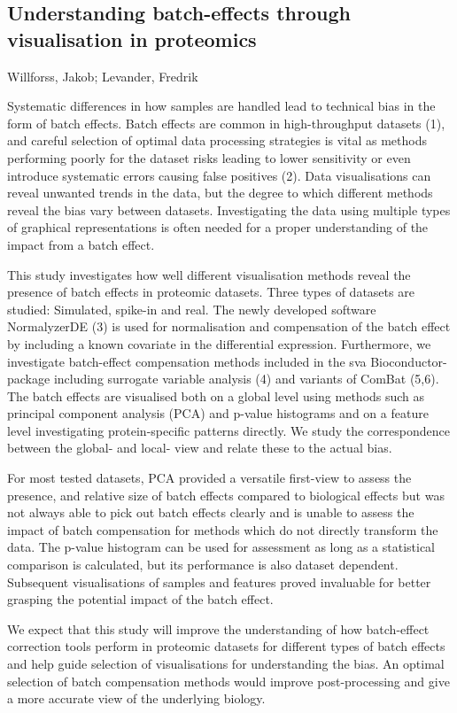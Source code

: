 {\subsection*{\color{eubicRed} Understanding batch-effects through visualisation in proteomics}
{\color{eubicGray}Willforss, Jakob;
Levander, Fredrik}

Systematic differences in how samples are handled lead to technical bias in the form of batch effects. Batch effects are common in high-throughput datasets (1), and careful selection of optimal data processing strategies is vital as methods performing poorly for the dataset risks leading to lower sensitivity or even introduce systematic errors causing false positives (2). Data visualisations can reveal unwanted trends in the data, but the degree to which different methods reveal the bias vary between datasets. Investigating the data using multiple types of graphical representations is often needed for a proper understanding of the impact from a batch effect.

This study investigates how well different visualisation methods reveal the presence of batch effects in proteomic datasets. Three types of datasets are studied: Simulated, spike-in and real. The newly developed software NormalyzerDE (3) is used for normalisation and compensation of the batch effect by including a known covariate in the differential expression. Furthermore, we investigate batch-effect compensation methods included in the sva Bioconductor-package including surrogate variable analysis (4) and variants of ComBat (5,6). The batch effects are visualised both on a global level using methods such as principal component analysis (PCA) and p-value histograms and on a feature level investigating protein-specific patterns directly. We study the correspondence between the global- and local- view and relate these to the actual bias.

For most tested datasets, PCA provided a versatile first-view to assess the presence, and relative size of batch effects compared to biological effects but was not always able to pick out batch effects clearly and is unable to assess the impact of batch compensation for methods which do not directly transform the data. The p-value histogram can be used for assessment as long as a statistical comparison is calculated, but its performance is also dataset dependent. Subsequent visualisations of samples and features proved invaluable for better grasping the potential impact of the batch effect.

We expect that this study will improve the understanding of how batch-effect correction tools perform in proteomic datasets for different types of batch effects and help guide selection of visualisations for understanding the bias. An optimal selection of batch compensation methods would improve post-processing and give a more accurate view of the underlying biology.

}
